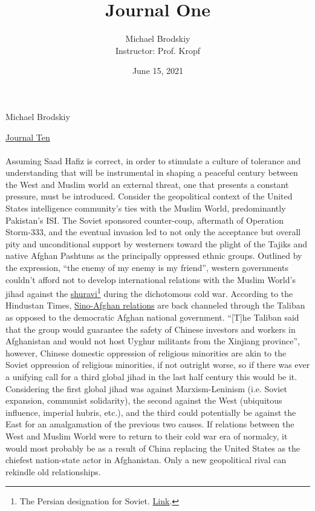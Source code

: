 \documentclass[12pt]{article}
\title{Journal One}
\date{June 15, 2021}
\author{Michael Brodskiy\\ \small Instructor: Prof. Kropf}
\begin{document}
\flushleft Michael Brodskiy

\begin{center}

 \underline{Journal Ten}

\end{center}

\begin{justify}
  \paragraph{} Assuming Saad Hafiz is correct, in order to stimulate a culture of tolerance and understanding that will be instrumental in shaping a peaceful  century between the West and Muslim world an external threat, one that presents a constant pressure, must be introduced. Consider the geopolitical context of the United States intelligence community's ties with the Muslim World, predominantly Pakistan's ISI. The Soviet sponsored counter-coup, aftermath of Operation Storm-333, and the eventual invasion led to not only the acceptance but overall pity and unconditional support by westerners toward the plight of the Tajiks and native Afghan Pashtuns as the principally oppressed ethnic groups. Outlined by the expression, “the enemy of my enemy is my friend”, western governments couldn't afford not to develop international relations with the Muslim World's jihad against the \underline{shuravi}\footnote{The Persian designation for Soviet. \href{https://en.wikipedia.org/wiki/Shuravi}{Link}.} during the dichotomous cold war. According to the Hindustan Times, \href{https://www.hindustantimes.com/world-news/china-asks-taliban-to-make-clean-break-from-terrorists-return-to-mainstream-101626254774269.html}{Sino-Afghan relations} are back channeled through the Taliban as opposed to the democratic Afghan national government. “[T]he Taliban said that the group would guarantee the safety of Chinese investors and workers in Afghanistan and would not host Uyghur militants from the Xinjiang province”, however, Chinese domestic oppression of religious minorities are akin to the Soviet oppression of religious minorities, if not outright worse, so if there was ever a unifying call for a third global jihad in the last half century this would be it. Considering the first global jihad was against Marxism-Leninism (i.e. Soviet expansion, communist solidarity), the second against the West (ubiquitous influence, imperial hubris, etc.), and the third could potentially be against the East for an amalgamation of the previous two causes. If relations between the West and Muslim World were to return to their cold war era of normalcy, it would most probably be as a result of China replacing the United States as the chiefest nation-state actor in Afghanistan. Only a new geopolitical rival can rekindle old relationships.
\end{justify}
\end{document}
